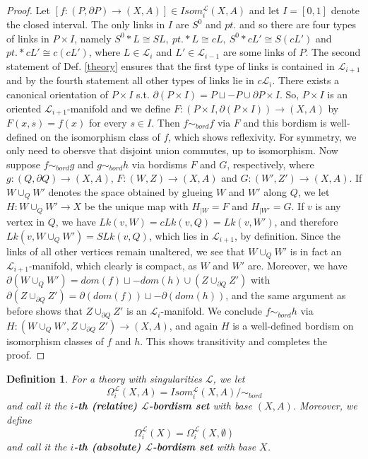 \documentclass[11pt]{book}
\newtheorem{definition}{Definition}
\begin{document}
\begin{proof}
Let $[f: (P, \partial P) \to (X,A)] \in Isom_{i}^{\mathcal{L}}(X,A)$ and let $I=[0,1]$ denote the closed interval. The only links in $I$ are $S^0$ and $pt.$ and so there are four types of links in $P \times I$, namely $S^0 * L \cong SL,\  pt. * L \cong cL,\  S^0 * cL' \cong S(cL')$ and $pt. * cL' \cong c(cL')$, where $L \in \mathcal{L}_i$ and $L' \in \mathcal{L}_{i-1}$ are some links of $P$. The second statement of Def. \ref{theory} ensures that the first type of links is contained in $\mathcal{L}_{i+1}$ and by the fourth statement all other types of links lie in $c \mathcal{L}_i$. There exists a canonical orientation of $P \times I$ s.t. $\partial (P \times I)= P \sqcup -P \cup \partial P \times I$. So, $P \times I$ is an oriented $\mathcal{L}_{i+1}$-manifold and we define $F: (P \times I, \partial(P \times I)) \to (X,A)$ by $F(x,s)=f(x)$ for every $s \in I$. Then $f \sim_{bord} f$ via $F$ and this bordism is well-defined on the isomorphism class of $f$, which shows reflexivity. For symmetry, we only need to obersve that disjoint union commutes, up to isomorphism. Now suppose $f \sim_{bord} g$ and $g \sim_{bord} h$ via bordisms $F$ and $G$, respectively, where $g: (Q, \partial Q) \to (X,A)$, $F: (W,Z) \to (X,A)$ and $G: (W',Z') \to (X,A)$. If $W \cup_{Q} W'$ denotes the space obtained by glueing $W$ and $W'$ along $Q$, we let $H: W \cup_{Q} W' \to X$ be the unique map with $H_{|W} = F$ and $H_{|W'}=G$. If $v$ is any vertex in $Q$, we have $Lk(v,W)=cLk(v,Q)=Lk(v,W')$, and therefore $Lk(v,W \cup_{Q} W') = SLk(v,Q)$, which lies in $\mathcal{L}_{i+1}$, by definition. Since the links of all other vertices remain unaltered, we see that $W \cup_{Q} W'$ is in fact an $\mathcal{L}_{i+1}$-manifold, which clearly is compact, as $W$ and $W'$ are. Moreover, we have $\partial (W \cup_{Q} W')= dom(f) \sqcup -dom(h) \cup (Z \cup_{\partial Q} Z')$ with $\partial (Z \cup_{\partial Q} Z')= \partial (dom(f)) \sqcup - \partial (dom(h))$, and the same argument as before shows that $Z \cup_{\partial Q} Z'$ is an $\mathcal{L}_i$-manifold. We conclude $f \sim_{bord} h$ via $H: (W \cup_{Q} W',Z \cup_{\partial Q} Z') \to (X,A)$, and again $H$ is a well-defined bordism on isomorphism classes of $f$ and $h$. This shows transitivity and completes the proof.
\end{proof}

\begin{definition}\label{bordismgroup}
For a theory with singularities $\mathcal{L}$, we let  
\begin{equation*}
\Omega_i^\mathcal{L}(X,A)= Isom_i^\mathcal{L}(X,A)/ \sim_{bord}
\end{equation*}
 and call it the \textbf{$i$-th (relative) $\mathcal{L}$-bordism set} with base $(X,A)$. Moreover, we define
\begin{equation*}
\Omega_i^\mathcal{L}(X)=\Omega_i^\mathcal{L}(X, \emptyset)
\end{equation*}
and call it the \textbf{$i$-th (absolute) $\mathcal{L}$-bordism set} with base $X$.
\end{definition}
\end{document}
